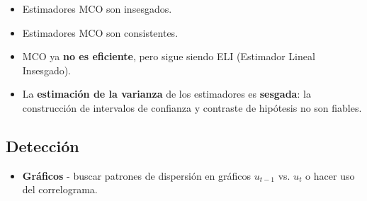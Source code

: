 \documentclass[10pt, a4paper, landscape]{article}
\begin{document}
\begin{multicols}{3}
\begin{itemize}[leftmargin=*]
	\item Estimadores MCO son insesgados.
	\item Estimadores MCO son consistentes.
	\item MCO ya \textbf{no es eficiente}, pero sigue siendo ELI (Estimador Lineal Insesgado).
	\item La \textbf{estimación de la varianza} de los estimadores es \textbf{sesgada}: la construcción de intervalos de confianza y contraste de hipótesis no son fiables.
\end{itemize}

\subsection*{Detección}

\begin{itemize}[leftmargin=*]
	\item \textbf{Gráficos} - buscar patrones de dispersión en gráficos \( u_{t - 1} \) vs. \( u_{t} \) o hacer uso del correlograma.
	

\end{itemize}
\end{multicols}
\end{document}
